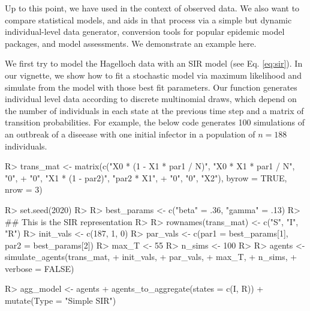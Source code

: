 \documentclass[
  shortnames]{jss}
\begin{document}
Up to this point, we have used  in the context of
observed data. We also want to compare statistical models, and
 aids in that process via a simple but dynamic
individual-level data generator, conversion tools for popular epidemic
model packages, and model assessments. We demonstrate an example here.

We first try to model the Hagelloch data with an SIR model (see Eq.
\ref{eq:sir}). In our vignette, we show how to fit a stochastic model
via maximum likelihood and simulate from the model with those best fit
parameters. Our function  generates individual
level data according to discrete multinomial draws, which depend on the
number of individuals in each state at the previous time step and a
matrix of transition probabilities. For example, the below code
generates 100 simulations of an outbreak of a diseease with one initial
infector in a population of \(n= 188\) individuals.

\begin{CodeChunk}
\begin{CodeInput}
R> trans_mat <- matrix(c("X0 * (1 - X1 * par1 / N)", "X0 * X1  * par1 / N", "0",
+                   "0", "X1 * (1 - par2)", "par2 * X1",
+                   "0", "0", "X2"), byrow = TRUE, nrow = 3)
\end{CodeInput}
\end{CodeChunk}

\begin{CodeChunk}
\begin{CodeInput}
R> set.seed(2020)
R> 
R> best_params <- c("beta" = .36, "gamma" = .13)
R> ## This is the SIR representation
R> 
R> rownames(trans_mat) <- c("S", "I", "R")
R> init_vals <- c(187, 1, 0)
R> par_vals <- c(par1 = best_params[1], par2 = best_params[2])
R> max_T <- 55
R> n_sims <- 100
R> 
R> agents <- simulate_agents(trans_mat,
+                        init_vals,
+                        par_vals,
+                        max_T,
+                        n_sims,
+                        verbose = FALSE)
\end{CodeInput}
\end{CodeChunk}

\begin{CodeChunk}
\begin{CodeInput}
R> agg_model <- agents %
+   agents_to_aggregate(states = c(I, R)) %
+   mutate(Type = "Simple SIR")
\end{CodeInput}
\end{CodeChunk}
\end{document}
